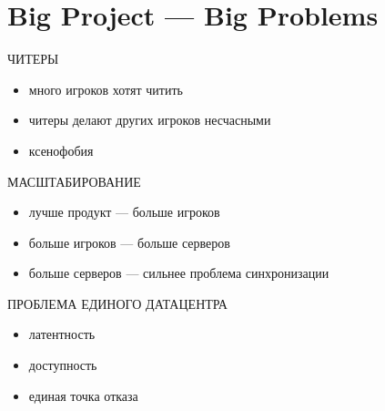 \documentclass[aspectratio=169]{beamer}
\begin{document}
\section{Big Project --- Big Problems}
{
\begin{frame}[plain]{}
\end{frame}
}

\begin{frame}{ЧИТЕРЫ}
    \begin{itemize}
        \item много игроков хотят читить
        \item читеры делают других игроков несчасными
        \item ксенофобия
    \end{itemize}
\end{frame}

\begin{frame}{МАСШТАБИРОВАНИЕ}
    \begin{itemize}
        \item лучше продукт --- больше игроков
        \item больше игроков --- больше серверов
        \item больше серверов --- сильнее проблема синхронизации
    \end{itemize}
\end{frame}

\begin{frame}{ПРОБЛЕМА ЕДИНОГО ДАТАЦЕНТРА}
    \begin{itemize}
        \item латентность
        \item доступность
        \item единая точка отказа
    \end{itemize}
\end{frame}
\end{document}
